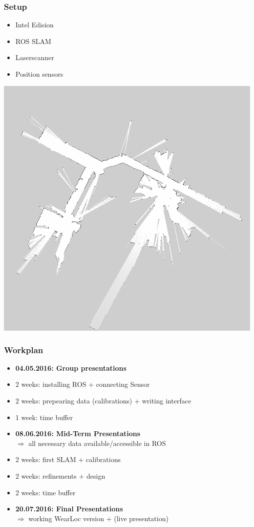 \documentclass{beamer}
\begin{document}
\begin{frame}
\frametitle{Setup}
\begin{minipage}[l]{0.5\textwidth}
\begin{itemize}
\item Intel Edision
\item ROS SLAM
\item Laserscanner
\item Position sensors
\end{itemize}
\end{minipage}
\begin{minipage}[r]{0.4\textwidth}
  \includegraphics[width=1\textwidth]{slam.png} 
\end{minipage}
\end{frame}

\begin{frame}
\frametitle{Workplan}
\begin{itemize}
\item \textbf{04.05.2016: Group presentations}
\item 2 weeks: installing ROS + connecting Sensor
\item 2 weeks: prepearing data (calibrations) + writing interface
\item 1 week: time buffer 
\item \textbf{08.06.2016: Mid-Term Presentations} \\
$\Rightarrow$ all necessary data available/accessible in ROS
\item 2 weeks: first SLAM + calibrations
\item 2 weeks: refinements + design
\item 2 weeks: time buffer
\item \textbf{20.07.2016: Final Presentations} \\
$\Rightarrow$ working WearLoc version + (live presentation) 
\end{itemize}
\end{frame}
\end{document}
